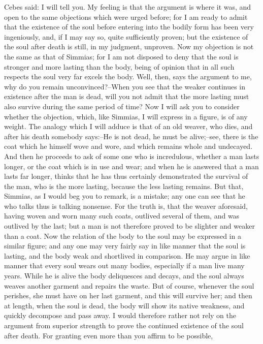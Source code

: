 Cebes said: I will tell you. My feeling is that the argument is where it
was, and open to the same objections which were urged before; for I am
ready to admit that the existence of the soul before entering into
the bodily form has been very ingeniously, and, if I may say so, quite
sufficiently proven; but the existence of the soul after death is still,
in my judgment, unproven. Now my objection is not the same as that of
Simmias; for I am not disposed to deny that the soul is stronger and
more lasting than the body, being of opinion that in all such respects
the soul very far excels the body. Well, then, says the argument to me,
why do you remain unconvinced?--When you see that the weaker continues
in existence after the man is dead, will you not admit that the more
lasting must also survive during the same period of time? Now I will
ask you to consider whether the objection, which, like Simmias, I will
express in a figure, is of any weight. The analogy which I will adduce
is that of an old weaver, who dies, and after his death somebody
says:--He is not dead, he must be alive;--see, there is the coat which
he himself wove and wore, and which remains whole and undecayed. And
then he proceeds to ask of some one who is incredulous, whether a man
lasts longer, or the coat which is in use and wear; and when he is
answered that a man lasts far longer, thinks that he has thus certainly
demonstrated the survival of the man, who is the more lasting, because
the less lasting remains. But that, Simmias, as I would beg you to
remark, is a mistake; any one can see that he who talks thus is talking
nonsense. For the truth is, that the weaver aforesaid, having woven and
worn many such coats, outlived several of them, and was outlived by the
last; but a man is not therefore proved to be slighter and weaker than
a coat. Now the relation of the body to the soul may be expressed in a
similar figure; and any one may very fairly say in like manner that the
soul is lasting, and the body weak and shortlived in comparison. He may
argue in like manner that every soul wears out many bodies, especially
if a man live many years. While he is alive the body deliquesces and
decays, and the soul always weaves another garment and repairs the
waste. But of course, whenever the soul perishes, she must have on her
last garment, and this will survive her; and then at length, when
the soul is dead, the body will show its native weakness, and quickly
decompose and pass away. I would therefore rather not rely on the
argument from superior strength to prove the continued existence of the
soul after death. For granting even more than you affirm to be possible,
